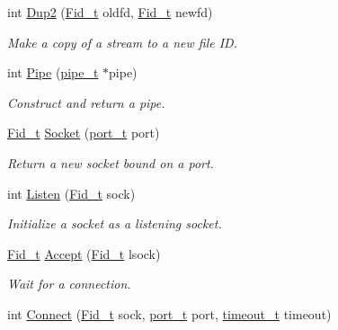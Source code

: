 \begin{DoxyCompactItemize}
int \hyperlink{group__syscalls_gacc048c60209e2dfb4b5cfc1c3f21aa88}{Dup2} (\hyperlink{group__syscalls_ga5097222c5f0da97d92d4712359abc38f}{Fid\-\_\-t} oldfd, \hyperlink{group__syscalls_ga5097222c5f0da97d92d4712359abc38f}{Fid\-\_\-t} newfd)
\begin{DoxyCompactList}\small\item\em Make a copy of a stream to a new file I\-D. \end{DoxyCompactList}\item 
int \hyperlink{group__syscalls_gab6355ce54e047c31538ed5ed9108b5b3}{Pipe} (\hyperlink{group__syscalls_gad56b5ceaaf7d3ab88b4be7f622314dfb}{pipe\-\_\-t} $\ast$pipe)
\begin{DoxyCompactList}\small\item\em Construct and return a pipe. \end{DoxyCompactList}\item 
\hyperlink{group__syscalls_ga5097222c5f0da97d92d4712359abc38f}{Fid\-\_\-t} \hyperlink{group__syscalls_gadf167321edde68e905173d8056d3eb2f}{Socket} (\hyperlink{group__syscalls_ga13894e5a2ffd5febb7aeb90e87239d61}{port\-\_\-t} port)
\begin{DoxyCompactList}\small\item\em Return a new socket bound on a port. \end{DoxyCompactList}\item 
int \hyperlink{group__syscalls_ga9ff5bae3e7b9e5bbf5a788a5ff739bf7}{Listen} (\hyperlink{group__syscalls_ga5097222c5f0da97d92d4712359abc38f}{Fid\-\_\-t} sock)
\begin{DoxyCompactList}\small\item\em Initialize a socket as a listening socket. \end{DoxyCompactList}\item 
\hyperlink{group__syscalls_ga5097222c5f0da97d92d4712359abc38f}{Fid\-\_\-t} \hyperlink{group__syscalls_ga8116ee944d1b03b6fb2fdba59b57d4a8}{Accept} (\hyperlink{group__syscalls_ga5097222c5f0da97d92d4712359abc38f}{Fid\-\_\-t} lsock)
\begin{DoxyCompactList}\small\item\em Wait for a connection. \end{DoxyCompactList}\item 
int \hyperlink{group__syscalls_ga747ceadd43e9a4c72b08fffbadaefbdd}{Connect} (\hyperlink{group__syscalls_ga5097222c5f0da97d92d4712359abc38f}{Fid\-\_\-t} sock, \hyperlink{group__syscalls_ga13894e5a2ffd5febb7aeb90e87239d61}{port\-\_\-t} port, \hyperlink{group__syscalls_ga036799055f409d83712b8c366aaa10d3}{timeout\-\_\-t} timeout)

\end{DoxyCompactItemize}

